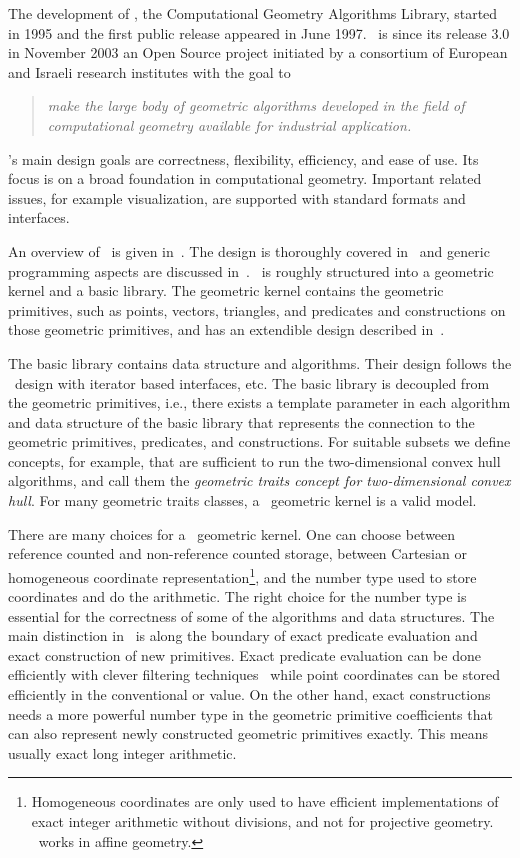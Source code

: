 The development of \cgal, the Computational Geometry Algorithms
Library, started in 1995 and the first public release appeared in June
1997. \cgal\ is since its release 3.0 in November 2003 an Open Source
project initiated by a consortium of European and Israeli research
institutes with the goal to
\begin{quote}
    {\em make the large body of geometric algorithms developed in the field
    of computational geometry available for industrial application.}
\end{quote}
\cgal's main design goals are correctness, flexibility, efficiency,
and ease of use. Its focus is on a broad foundation in computational
geometry. Important related issues, for example visualization, are
supported with standard formats and interfaces.

An overview of \cgal\ is given in~\cite{Kettner04Handbook}. The design
is thoroughly covered in~\cite{fgkss-dccga-00} and generic programming
aspects are discussed in~\cite{bksv-agppd-00}. \cgal\ is roughly
structured into a geometric kernel and a basic library. The geometric
kernel contains the geometric primitives, such as points, vectors,
triangles, and predicates and constructions on those geometric
primitives, and has an extendible design described
in~\cite{hhkps-aegk-01}. 

The basic library contains data structure and
algorithms.  Their design follows the \stl\ design with iterator based
interfaces, etc. The basic library is decoupled from the geometric
primitives, i.e., there exists a template parameter in each
algorithm and data structure of the basic library that represents the
connection to the geometric primitives, predicates, and constructions.
For suitable subsets we define concepts, for example,
that are sufficient to run the two-dimensional convex hull algorithms,
and call them the \emph{geometric traits concept for two-dimensional
convex hull}. For many geometric traits classes, a \cgal\ geometric
kernel is a valid model.

There are many choices for a \cgal\ geometric kernel. One can choose
between reference counted and non-reference counted storage, between
Cartesian or homogeneous coordinate
representation\footnote{Homogeneous coordinates are only used to have
  efficient implementations of exact integer arithmetic without
  divisions, and not for projective geometry. \cgal\ works in affine
  geometry.}, and the number type used to store coordinates and do the
arithmetic. The right choice for the number type is essential for the
correctness of some of the algorithms and data structures. The main
distinction in \cgal\ is along the boundary of exact predicate
evaluation and exact construction of new primitives. Exact predicate
evaluation can be done efficiently with clever filtering
techniques~\cite{bbp-iayed-01} while point coordinates can be stored
efficiently in the conventional  or 
value. On the other hand, exact constructions needs a more powerful
number type in the geometric primitive coefficients that can also
represent newly constructed geometric primitives exactly. This means
usually exact long integer arithmetic. 

